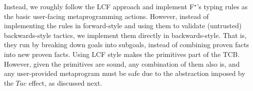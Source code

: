 \documentclass[runningheads]{llncs}
\newcommand\fstar{F$^\star$\xspace}
\newcommand\metafstar{Meta-F$^\star$\xspace}
\newcommand{\comm}[3]{\ifcheckpagebudget\else\ifdraft{{\color{#1}[#2: #3]}}\fi\fi}
\newcommand{\ch}[1]{\comm{teal}{CH}{#1}}
\newcommand{\guido}[1]{\comm{blue}{Guido}{#1}}
\newcommand{\da}[1]{\comm{dkyellow}{Danel}{#1}}
\begin{document}
Instead, we roughly follow
the LCF approach and implement \fstar's typing rules
as the basic user-facing metaprogramming actions.
%
However, instead of implementing the rules in forward-style and using
them to validate (untrusted) backwards-style tactics, we implement them
directly in backwards-style.
%
That is, they run by breaking down goals into subgoals,
instead of combining proven facts into new proven facts.
%
Using LCF style makes the primitives part of the TCB.
%
However, given the primitives are sound, any combination of them
also is, and any user-provided metaprogram must be safe due to the
abstraction imposed by the \ls$Tac$ effect, as discussed next.

%

%

%
%

\end{document}
